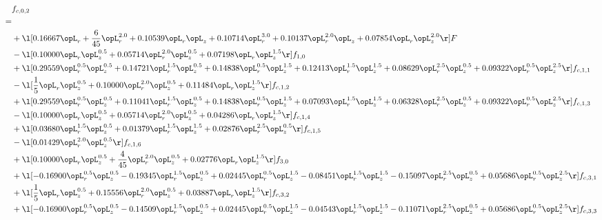 \begin{alignat}{2} 
\label{eq:f_02_2} 
& f_{c,0,2} \nonumber \\ 
 = \\ 
& + \l[  0.16667 \opL_r + \frac{6}{45} \opL_r^{2.0} +  0.10539 \opL_r \opL_z +  0.10714 \opL_r^{3.0} +  0.10137 \opL_r^{2.0} \opL_z +  0.07854 \opL_r \opL_z^{2.0}  \r] F \nonumber \\ 
& - \l[  0.10000 \opL_r \opL_z^{0.5} +  0.05714 \opL_r^{2.0} \opL_z^{0.5} +  0.07198 \opL_r \opL_z^{1.5}  \r] f_{1,0} \nonumber \\ 
& + \l[  0.29559 \opL_r^{0.5} \opL_z^{0.5} +  0.14721 \opL_r^{1.5} \opL_z^{0.5} +  0.14838 \opL_r^{0.5} \opL_z^{1.5} +  0.12413 \opL_r^{1.5} \opL_z^{1.5} +  0.08629 \opL_r^{2.5} \opL_z^{0.5} +  0.09322 \opL_r^{0.5} \opL_z^{2.5}  \r] f_{c,1,1} \nonumber \\ 
& - \l[ \frac{1}{5} \opL_r \opL_z^{0.5} +  0.10000 \opL_r^{2.0} \opL_z^{0.5} +  0.11484 \opL_r \opL_z^{1.5}  \r] f_{c,1,2} \nonumber \\ 
& + \l[  0.29559 \opL_r^{0.5} \opL_z^{0.5} +  0.11041 \opL_r^{1.5} \opL_z^{0.5} +  0.14838 \opL_r^{0.5} \opL_z^{1.5} +  0.07093 \opL_r^{1.5} \opL_z^{1.5} +  0.06328 \opL_r^{2.5} \opL_z^{0.5} +  0.09322 \opL_r^{0.5} \opL_z^{2.5}  \r] f_{c,1,3} \nonumber \\ 
& - \l[  0.10000 \opL_r \opL_z^{0.5} +  0.05714 \opL_r^{2.0} \opL_z^{0.5} +  0.04286 \opL_r \opL_z^{1.5}  \r] f_{c,1,4} \nonumber \\ 
& + \l[  0.03680 \opL_r^{1.5} \opL_z^{0.5} +  0.01379 \opL_r^{1.5} \opL_z^{1.5} +  0.02876 \opL_r^{2.5} \opL_z^{0.5}  \r] f_{c,1,5} \nonumber \\ 
& - \l[  0.01429 \opL_r^{2.0} \opL_z^{0.5}  \r] f_{c,1,6} \nonumber \\ 
& + \l[  0.10000 \opL_r \opL_z^{0.5} + \frac{4}{45} \opL_r^{2.0} \opL_z^{0.5} +  0.02776 \opL_r \opL_z^{1.5}  \r] f_{3,0} \nonumber \\ 
& + \l[  -0.16900 \opL_r^{0.5} \opL_z^{0.5}   -0.19345 \opL_r^{1.5} \opL_z^{0.5} +  0.02445 \opL_r^{0.5} \opL_z^{1.5}   -0.08451 \opL_r^{1.5} \opL_z^{1.5}   -0.15097 \opL_r^{2.5} \opL_z^{0.5} +  0.05686 \opL_r^{0.5} \opL_z^{2.5}  \r] f_{c,3,1} \nonumber \\ 
& + \l[ \frac{1}{5} \opL_r \opL_z^{0.5} +  0.15556 \opL_r^{2.0} \opL_z^{0.5} +  0.03887 \opL_r \opL_z^{1.5}  \r] f_{c,3,2} \nonumber \\ 
& + \l[  -0.16900 \opL_r^{0.5} \opL_z^{0.5}   -0.14509 \opL_r^{1.5} \opL_z^{0.5} +  0.02445 \opL_r^{0.5} \opL_z^{1.5}   -0.04543 \opL_r^{1.5} \opL_z^{1.5}   -0.11071 \opL_r^{2.5} \opL_z^{0.5} +  0.05686 \opL_r^{0.5} \opL_z^{2.5}  \r] f_{c,3,3} \nonumber \\ 

\end{alignat}
